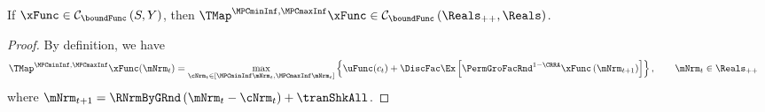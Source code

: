 \documentclass[\econtexRoot/BufferStockTheory]{subfiles}
\begin{document}
\begin{claim}\label{clm:hiraguchi_cont}
If $\xFunc\in  \mathcal{C}_{\boundFunc }\left( S,Y\right)$, then $\TMap^{\MPCminInf, \MPCmaxInf}{\mathfrak{\xFunc}}\in \mathcal{C}_{\boundFunc }\left(\Reals_{++}, \Reals\right)$.
\end{claim}
%
\begin{proof}
By definition, we have
%
\begin{equation}\begin{gathered}\begin{aligned}
  \TMap^{\MPCminInf, \MPCmaxInf}{\mathfrak{\xFunc}}(\mNrm_{t}) & = \underset{\cNrm_{t} \in
                                            [\MPCminInf \mNrm_{t}, \MPCmaxInf \mNrm_{t}]
                                            }\max \left\{
                                            \uFunc(c_{t})+\DiscFac \Ex\left[ {\PermGroFacRnd}^{1-\CRRA }{\mathfrak{\xFunc}}
                                            \left( {\mNrm}_{t+1}\right) \right] \right\}, \qquad \mNrm_{t}\in \Reals_{++}  %
\end{aligned}\end{gathered}\end{equation}
%
where ${\mNrm}_{t+1} = \RNrmByGRnd\left(\mNrm_{t} - \cNrm_{t}\right) + \tranShkAll$.


\end{proof}
\end{document}
